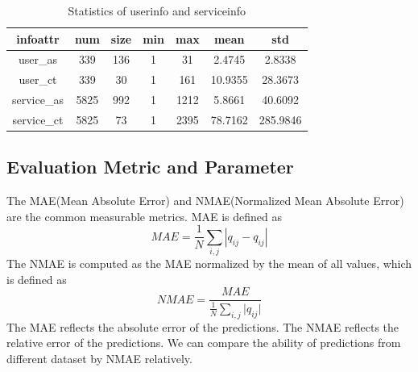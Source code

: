 \documentclass[conference]{IEEEtran}
\begin{document}
\begin{table}[H]
\begin{threeparttable}
\caption{Statistics of userinfo and serviceinfo}
\label{tb2}
\begin{tabular}{c||c|c||c|c|c|c}
\hline 
infoattr & num & size & min & max & mean & std \\
\hline
user\_as & 339   & 136   & 1     & 31    & 2.4745 & 2.8338 \\
\hline
user\_ct & 339   & 30    & 1     & 161   & 10.9355 & 28.3673 \\
\hline
service\_as & 5825  & 992   & 1     & 1212  & 5.8661 & 40.6092 \\
\hline
service\_ct & 5825  & 73    & 1     & 2395  & 78.7162 & 285.9846 \\
\hline
\end{tabular} 
\end{threeparttable}
\end{table}

\subsection{Evaluation Metric and Parameter}
The MAE(Mean Absolute Error) and NMAE(Normalized Mean Absolute Error) are the common measurable metrics. MAE is defined as 
\begin{equation}
MAE=\frac{1}{N}\sum_{i,j}{|q_{ij}-q^{\hat{}}_{ij}|}
\end{equation}
The NMAE is computed as the MAE normalized by the mean of all values, which is defined as 
\begin{equation}
NMAE=\frac{MAE}{\frac{1}{N}\sum_{i,j}{|q_{ij}}|}
\end{equation}
The MAE reflects the absolute error of the predictions. The NMAE reflects the relative error of the predictions. We can compare the ability of predictions from different dataset by NMAE relatively.
\end{document}
